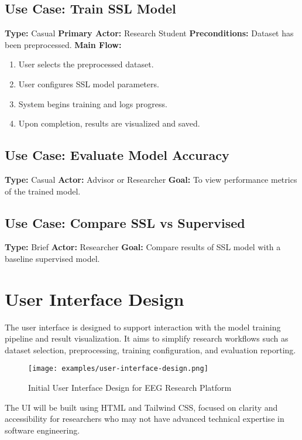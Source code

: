 \subsection*{Use Case: Train SSL Model}
\textbf{Type:} Casual
\textbf{Primary Actor:} Research Student
\textbf{Preconditions:} Dataset has been preprocessed.
\textbf{Main Flow:}
\begin{enumerate}
    \item User selects the preprocessed dataset.
    \item User configures SSL model parameters.
    \item System begins training and logs progress.
    \item Upon completion, results are visualized and saved.
\end{enumerate}

\subsection*{Use Case: Evaluate Model Accuracy}
\textbf{Type:} Casual
\textbf{Actor:} Advisor or Researcher
\textbf{Goal:} To view performance metrics of the trained model.

\subsection*{Use Case: Compare SSL vs Supervised}
\textbf{Type:} Brief
\textbf{Actor:} Researcher
\textbf{Goal:} Compare results of SSL model with a baseline supervised model.

\section{User Interface Design}
\label{section:user-interface-design}

The user interface is designed to support interaction with the model training pipeline and result visualization. It aims to simplify research workflows such as dataset selection, preprocessing, training configuration, and evaluation reporting.

\begin{figure}[H]
    \centering
    \texttt{[image: examples/user-interface-design.png]}
    \caption{Initial User Interface Design for EEG Research Platform}
\end{figure}

The UI will be built using HTML and Tailwind CSS, focused on clarity and accessibility for researchers who may not have advanced technical expertise in software engineering.
